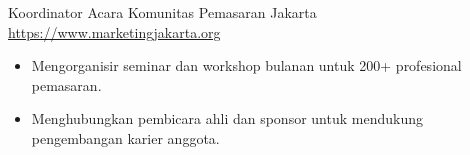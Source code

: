 \documentclass[a4paper, serif, 10pt]{moderncv}
\begin{document}
        {Koordinator Acara}
        {Komunitas Pemasaran Jakarta}
        {\url{https://www.marketingjakarta.org}}
        {}
        {\begin{itemize}
\item Mengorganisir seminar dan workshop bulanan untuk 200+ profesional pemasaran.
\item Menghubungkan pembicara ahli dan sponsor untuk mendukung pengembangan karier anggota.
\end{itemize}}
    
\end{document}
